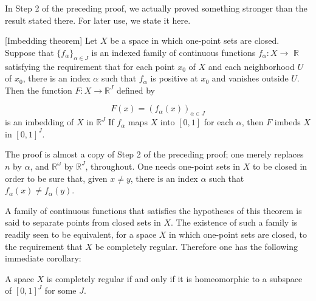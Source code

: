 In Step 2 of the preceding proof, we actually proved something stronger than the result stated there. For later use, we state it here.

\begin{theorem}
\label{thm:\thetheorem}[Imbedding theorem]
 Let \(X\) be a space in which one-point sets are closed. Suppose that \({\{ f_{\alpha }\} }_{\alpha \in J}\) is an indexed family of continuous functions \(f_{\alpha } : X \rightarrow\) \(\mathbb{R}\) satisfying the requirement that for each point \(x_{0}\) of \(X\) and each neighborhood \(U\) of \(x_{0}\), there is an index \(\alpha\) such that \(f_{\alpha }\) is positive at \(x_{0}\) and vanishes outside \(U\). Then the function \(F : X \rightarrow {\mathbb{R}}^{J}\) defined by

\[
F(x) = {( f_{\alpha }(x) ) }_{\alpha \in J}
\]
is an imbedding of \(X\) in \(\mathbb{R}^{J}\) If \(f_{\alpha }\) maps \(X\) into \([ {0,1}]\) for each \(\alpha\), then \(F\) imbeds \(X\) in \({[ 0,1] }^{J}\).

The proof is almost a copy of Step 2 of the preceding proof; one merely replaces \(n\) by \(\alpha\), and \(\mathbb{R}^{\omega }\) by \(\mathbb{R}^{J}\), throughout. One needs one-point sets in \(X\) to be closed in order to be sure that, given \(x \neq y\), there is an index \(\alpha\) such that \(f_{\alpha }(x) \neq {f}_{\alpha }( y)\).

A family of continuous functions that satisfies the hypotheses of this theorem is said to separate points from closed sets in \(X\). The existence of such a family is readily seen to be equivalent, for a space \(X\) in which one-point sets are closed, to the requirement that \(X\) be completely regular. Therefore one has the following immediate corollary:

\end{theorem}
\begin{theorem}
\label{thm:\thetheorem}
 A space \(X\) is completely regular if and only if it is homeomorphic to a subspace of \({[ 0,1] }^{J}\) for some \(J\).

\end{theorem}
